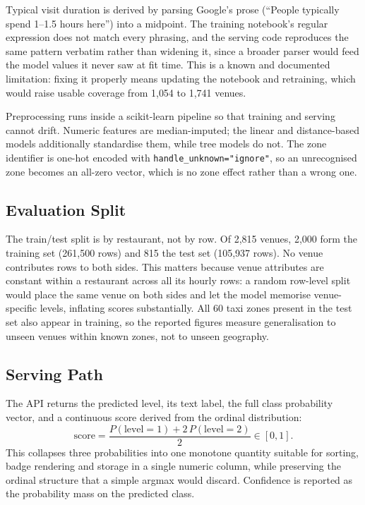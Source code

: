 \documentclass[conference]{IEEEtran}
\begin{document}
Typical visit duration is derived by parsing Google's prose (``People typically spend 1--1.5 hours here'') into a midpoint. The training notebook's regular expression does not match every phrasing, and the serving code reproduces the same pattern verbatim rather than widening it, since a broader parser would feed the model values it never saw at fit time. This is a known and documented limitation: fixing it properly means updating the notebook and retraining, which would raise usable coverage from 1{,}054 to 1{,}741 venues.

Preprocessing runs inside a scikit-learn pipeline so that training and serving cannot drift. Numeric features are median-imputed; the linear and distance-based models additionally standardise them, while tree models do not. The zone identifier is one-hot encoded with \texttt{handle\_unknown="ignore"}, so an unrecognised zone becomes an all-zero vector, which is no zone effect rather than a wrong one.

\subsection{Evaluation Split}

The train/test split is by restaurant, not by row. Of 2{,}815 venues, 2{,}000 form the training set (261{,}500 rows) and 815 the test set (105{,}937 rows). No venue contributes rows to both sides. This matters because venue attributes are constant within a restaurant across all its hourly rows: a random row-level split would place the same venue on both sides and let the model memorise venue-specific levels, inflating scores substantially. All 60 taxi zones present in the test set also appear in training, so the reported figures measure generalisation to unseen venues within known zones, not to unseen geography.

\subsection{Serving Path}

The API returns the predicted level, its text label, the full class probability vector, and a continuous score derived from the ordinal distribution:
\begin{equation}
\text{score} = \frac{P(\text{level}{=}1) + 2\,P(\text{level}{=}2)}{2} \in [0,1].
\end{equation}
This collapses three probabilities into one monotone quantity suitable for sorting, badge rendering and storage in a single numeric column, while preserving the ordinal structure that a simple argmax would discard. Confidence is reported as the probability mass on the predicted class.
\end{document}
